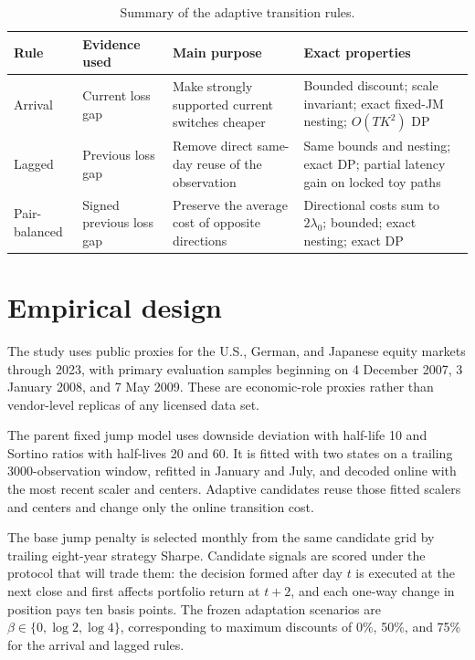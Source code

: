 \begin{table}[t]
\centering
\caption{Summary of the adaptive transition rules.}
\label{tab:rules}
\small
\begin{threeparttable}
\begin{tabular}{@{}p{1.9cm}p{2.5cm}p{3.4cm}p{4.2cm}@{}}
\toprule
Rule & Evidence used & Main purpose & Exact properties \\
\midrule
Arrival & Current loss gap & Make strongly supported current switches cheaper &
Bounded discount; scale invariant; exact fixed-JM nesting; $O(TK^2)$ DP \\
Lagged & Previous loss gap & Remove direct same-day reuse of the observation &
Same bounds and nesting; exact DP; partial latency gain on locked toy paths \\
Pair-balanced & Signed previous loss gap & Preserve the average cost of opposite
directions & Directional costs sum to $2\lambda_0$; bounded; exact nesting; exact
DP \\
\bottomrule
\end{tabular}
\end{threeparttable}
\end{table}

\section{Empirical design}

The study uses public proxies for the U.S., German, and Japanese equity markets
through 2023, with primary evaluation samples beginning on 4 December 2007,
3 January 2008, and 7 May 2009. These are economic-role proxies rather than
vendor-level replicas of any licensed data set.

The parent fixed jump model uses downside deviation with half-life 10 and Sortino
ratios with half-lives 20 and 60. It is fitted with two states on a trailing
3000-observation window, refitted in January and July, and decoded online with
the most recent scaler and centers. Adaptive candidates reuse those fitted
scalers and centers and change only the online transition cost.

The base jump penalty is selected monthly from the same candidate grid by
trailing eight-year strategy Sharpe. Candidate signals are scored under the
protocol that will trade them: the decision formed after day $t$ is executed at
the next close and first affects portfolio return at $t+2$, and each one-way
change in position pays ten basis points. The frozen adaptation scenarios are
$\beta\in\{0,\log 2,\log 4\}$, corresponding to maximum discounts of 0\%, 50\%,
and 75\% for the arrival and lagged rules.

